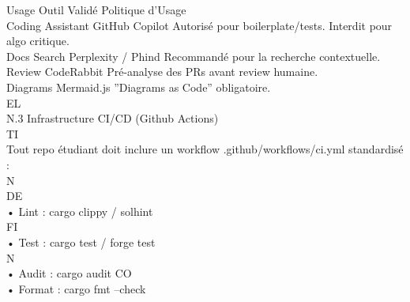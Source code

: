 \vspace{0.5em}
Usage            Outil Validé       Politique d’Usage\\
Coding Assistant GitHub Copilot     Autorisé pour boilerplate/tests. Interdit pour algo critique.\\
Docs Search      Perplexity / Phind Recommandé pour la recherche contextuelle.\\
Review           CodeRabbit         Pré-analyse des PRs avant review humaine.\\
Diagrams         Mermaid.js         ”Diagrams as Code” obligatoire.\\
\vspace{0.5em}
\vspace{0.5em}
\vspace{0.5em}
\vspace{0.5em}
EL\\
N.3 Infrastructure CI/CD (Github Actions)\\
\vspace{0.5em}
\vspace{0.5em}
\vspace{0.5em}
\vspace{0.5em}
TI\\
Tout repo étudiant doit inclure un workflow .github/workflows/ci.yml standardisé :\\
\vspace{0.5em}
\vspace{0.5em}
\vspace{0.5em}
\vspace{0.5em}
N\\
DE\\
• Lint : cargo clippy / solhint\\
\vspace{0.5em}
\vspace{0.5em}
\vspace{0.5em}
\vspace{0.5em}
FI\\
• Test : cargo test / forge test\\
\vspace{0.5em}
\vspace{0.5em}
\vspace{0.5em}
\vspace{0.5em}
N\\
• Audit : cargo audit                          CO\\
• Format : cargo fmt --check\\
\vspace{0.5em}
\vspace{0.5em}
